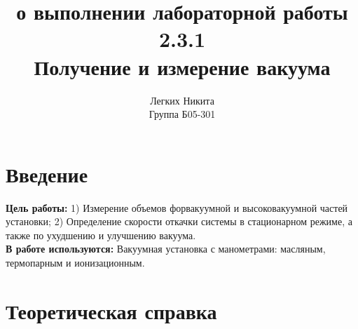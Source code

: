 \documentclass[a4paper, 12pt]{article}
\author{Легких Никита\\
Группа Б05-301}
\title{{\bf{\hugeОтчет о выполнении лабораторной работы 2.3.1}}\\[10pt]
Получение и измерение вакуума}
\date{}
\begin{document}
\maketitle
\newpage
\section{Введение}
\textbf{Цель работы:} 1) Измерение объемов форвакуумной и высоковакуумной частей установки; 2) Определение скорости откачки системы в стационарном режиме, а также по ухудшению и улучшению вакуума.\\
\textbf{В работе используются:} Вакуумная установка с манометрами: масляным, термопарным и ионизационным.

\section{Теоретическая справка}
\end{document}
